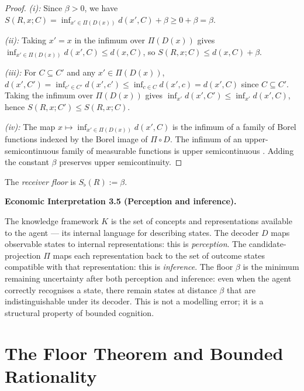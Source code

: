 \documentclass[twocolumn,11pt,a4paper]{article}
\newenvironment{econinterp}[1]{%
  \medskip\noindent\textbf{Economic Interpretation #1.}\normalfont\itshape\space
}{%
  \medskip
}
\newcommand{\Sfloor}{S_{\flat}}
\begin{document}
\begin{proof}
\textit{(i):} Since $\beta>0$, we have
$S(R,x;C)=\inf_{x'\in\Pi(D(x))}d(x',C)+\beta\geq 0+\beta=\beta$.

\textit{(ii):} Taking $x'=x$ in the infimum over $\Pi(D(x))$ gives
$\inf_{x'\in\Pi(D(x))}d(x',C)\leq d(x,C)$, so
$S(R,x;C)\leq d(x,C)+\beta$.

\textit{(iii):} For $C\subseteq C'$ and any $x'\in\Pi(D(x))$,
$d(x',C')=\inf_{c'\in C'}d(x',c')\leq\inf_{c\in C}d(x',c)=d(x',C)$
since $C\subseteq C'$.  Taking the infimum over $\Pi(D(x))$ gives
$\inf_{x'}d(x',C')\leq\inf_{x'}d(x',C)$, hence
$S(R,x;C')\leq S(R,x;C)$.

\textit{(iv):} The map $x\mapsto\inf_{x'\in\Pi(D(x))}d(x',C)$ is the
infimum of a family of Borel functions indexed by the Borel image of
$\Pi\circ D$.  The infimum of an upper-semicontinuous family of
measurable functions is upper semicontinuous \cite[Thm.~7.14]{rudin1976}.
Adding the constant $\beta$ preserves upper semicontinuity.
\end{proof}

\begin{definition}
\label{def:receiverfloor}
The \emph{receiver floor} is $\Sfloor(R):=\beta$.
\end{definition}

\begin{econinterp}{3.5 (Perception and inference)}
The knowledge framework $K$ is the set of concepts and representations
available to the agent — its internal language for describing states.
The decoder $D$ maps observable states to internal representations: this
is \emph{perception}.  The candidate-projection $\Pi$ maps each
representation back to the set of outcome states compatible with that
representation: this is \emph{inference}.  The floor $\beta$ is the
minimum remaining uncertainty after both perception and inference:
even when the agent correctly recognises a state, there remain states at
distance $\beta$ that are indistinguishable under its decoder.  This is
not a modelling error; it is a structural property of bounded cognition.
\end{econinterp}

\section{The Floor Theorem and Bounded Rationality}
\label{sec:floor}
\end{document}
